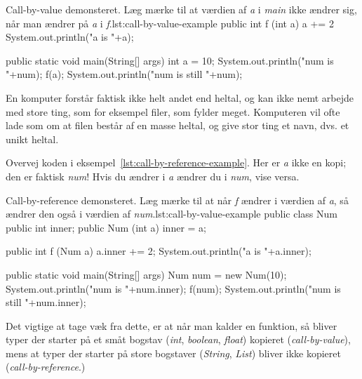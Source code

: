         \begin{JavaCode}{Call-by-value demonsteret. Læg mærke til at værdien af \emph{a} i \emph{main} ikke ændrer sig, når man ændrer på \emph{a} i \emph{f}.}{lst:call-by-value-example}
            public int f (int a) {
                a += 2
                System.out.println("a is "+a);
            }

            public static void main(String[] args) {
                int a = 10;
                System.out.println("num is "+num);
                f(a);
                System.out.println("num is still "+num);
            }
        \end{JavaCode}

        En komputer forstår faktisk ikke helt andet end heltal, og kan
        ikke nemt arbejde med store ting, som for eksempel filer, som
        fylder meget. Komputeren vil ofte lade som om at filen består
        af en masse heltal, og give stor ting et navn, dvs. et unikt
        heltal.

        Overvej koden i eksempel~\ref{lst:call-by-reference-example}.
        Her er \emph{a} ikke en kopi; den er faktisk \emph{num}! Hvis
        du ændrer i \emph{a} ændrer du i \emph{num}, vise versa.

        \begin{JavaCode}{Call-by-reference demonsteret. Læg mærke til at når \emph{f} ændrer i værdien af \emph{a}, så ændrer den også i værdien af \emph{num}.}{lst:call-by-value-example}
            public class Num {
                public int inner;
                public Num (int a) { inner = a; }
            }

            public int f (Num a) {
                a.inner += 2;
                System.out.println("a is "+a.inner);
            }

            public static void main(String[] args) {
                Num num = new Num(10);
                System.out.println("num is "+num.inner);
                f(num);
                System.out.println("num is still "+num.inner);
            }
        \end{JavaCode}

        Det vigtige at tage væk fra dette, er at når man kalder en
        funktion, så bliver typer der starter på et småt bogstav
        (\emph{int}, \emph{boolean}, \emph{float}) kopieret
        (\emph{call-by-value}), mens at typer der starter på store
        bogstaver (\emph{String}, \emph{List}) bliver ikke kopieret
        (\emph{call-by-reference}.)

